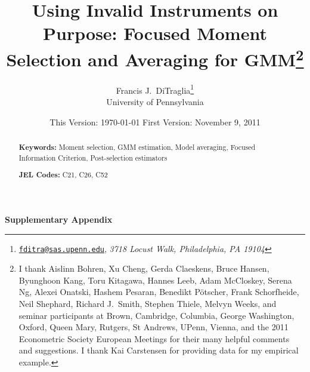 \documentclass[12pt]{article}
\begin{document}
\title{Using Invalid Instruments on Purpose: Focused Moment Selection and Averaging for GMM\footnote{I thank Aislinn Bohren, Xu Cheng, Gerda Claeskens, Bruce Hansen, Byunghoon Kang, Toru Kitagawa, Hannes Leeb, Adam McCloskey, Serena Ng, Alexei Onatski, Hashem Pesaran, Benedikt P\"{o}tscher, Frank Schorfheide, Neil Shephard, Richard J.\ Smith, Stephen Thiele, Melvyn Weeks, and seminar participants at 
Brown, Cambridge, Columbia, George Washington, Oxford, Queen Mary, Rutgers, St Andrews, UPenn, Vienna, and the 2011 Econometric Society European Meetings for their many helpful comments and suggestions. I thank Kai Carstensen for providing data for my empirical example.}}

\author{Francis J.\ DiTraglia\footnote{
\href{mailto:fditra@sas.upenn.edu}{\texttt{fditra@sas.upenn.edu}}, \emph{3718 Locust Walk, Philadelphia, PA 19104}}
 \\ University of Pennsylvania}

\date{\footnotesize This Version: \today \hspace{0.5em} First Version: November 9, 2011}

\maketitle 
\begin{abstract}
	

	\bigskip
	\noindent\textbf{Keywords:} Moment selection, GMM estimation, Model averaging, Focused Information Criterion, Post-selection estimators

	\medskip
	\noindent\textbf{JEL Codes:} C21, C26, C52 
\end{abstract}
















\newpage



\small


\appendix
\normalsize
\clearpage
{}%
\renewcommand*{\thepage}{A-\arabic{page}}

\begin{center}
  {\Huge \textbf{Supplementary Appendix}}
\end{center}









%
\end{document}
